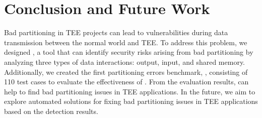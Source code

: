 \section{Conclusion and Future Work} \label{s:con}
Bad partitioning in TEE projects can lead to vulnerabilities during data transmission between the normal world and TEE. 
To address this problem, we designed \ccSysName, a tool that can identify security risks arising from bad partitioning by analyzing three types of data interactions: output, input, and shared memory. 
Additionally, we created the first partitioning errors benchmark, \ccBenchName, consisting of 110 test cases to evaluate the effectiveness of \ccSysName.
From the evaluation results, \ccSysName can help to find bad partitioning issues in TEE applications.
In the future, we aim to explore automated solutions for fixing bad partitioning issues in TEE applications based on the detection results.